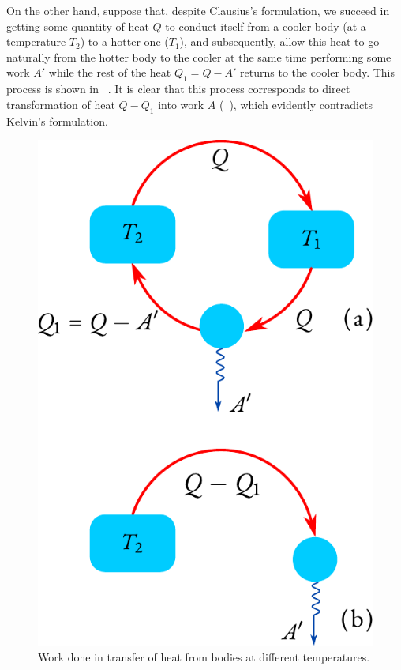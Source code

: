 On the other hand, suppose that, despite Clausius's formulation, we succeed in getting some quantity of heat $Q$ to conduct itself from a cooler body (at a temperature $T_{2}$) to a hotter one ($T_{1}$), and subsequently, allow this heat to go naturally from the hotter body to the cooler at the same time performing some work $A'$ while the rest of the heat $Q_{1} = Q - A'$ returns to the cooler body. This process is shown in ~. It is clear that this process corresponds to direct transformation of heat $Q - Q_{1}$ into work $A$ (~), which evidently contradicts Kelvin's formulation.

\begin{figure}%
\centering
\includegraphics[width=\textwidth]{figures/perp.pdf}
\caption{Work done in transfer of heat from bodies at different temperatures.}
\label{perp}
\end{figure}

